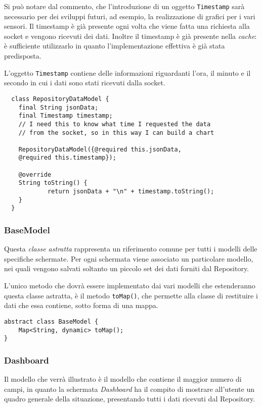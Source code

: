Si può notare dal commento, che l'introduzione di un oggetto \verb|Timestamp| sarà necessario per dei sviluppi futuri, ad esempio, la realizzazione di grafici per i vari sensori. Il timestamp è già presente ogni volta che viene fatta una richiesta alla socket e vengono ricevuti dei dati. Inoltre il timestamp è già presente nella \textit{cache}: è sufficiente utilizzarlo in quanto l'implementazione effettiva è già stata predisposta.

L'oggetto \verb|Timestamp| contiene delle informazioni riguardanti l'ora, il minuto e il secondo in cui i dati sono stati ricevuti dalla socket.

  \begin{lstlisting}
  class RepositoryDataModel {
  	final String jsonData;
  	final Timestamp timestamp;
  	// I need this to know what time I requested the data  
  	// from the socket, so in this way I can build a chart

  	RepositoryDataModel({@required this.jsonData, 
  	@required this.timestamp});

  	@override
  	String toString() {
    		return jsonData + "\n" + timestamp.toString();
  	}
  }
  \end{lstlisting}
  
\subsubsection{BaseModel}
Questa \textit{classe astratta} rappresenta un riferimento comune per tutti i modelli delle specifiche schermate. Per ogni schermata viene associato un particolare modello, nei quali vengono salvati soltanto un piccolo set dei dati forniti dal Repository.

L'unico metodo che dovrà essere implementato dai vari modelli che estenderanno questa classe astratta, è il metodo \verb|toMap()|, che permette alla classe di restituire i dati che essa contiene, sotto forma di una mappa.

\begin{lstlisting}
abstract class BaseModel {
  	Map<String, dynamic> toMap();
}
\end{lstlisting}

\subsubsection{Dashboard}
Il modello che verrà illustrato è il modello che contiene il maggior numero di campi, in quanto la schermata \textit{Dashboard} ha il compito di mostrare all'utente un quadro generale della situazione, presentando tutti i dati ricevuti dal Repository.

